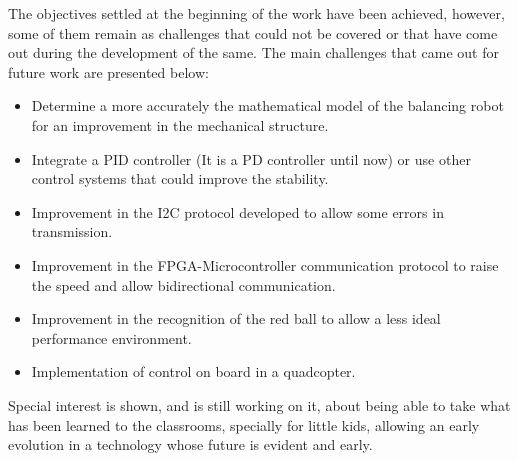 The objectives settled at the beginning of the work have been achieved, however, some of them remain as challenges that could not be covered or that have come out during the development of the same. The main challenges that came out for future work are presented below:
\begin{itemize}
	\item Determine a more accurately the mathematical model of the balancing robot for an improvement in the mechanical structure.
	\item Integrate a PID controller (It is a PD controller until now) or use other control systems that could improve the stability.
	\item Improvement in the I2C protocol developed to allow some errors in transmission.
	\item Improvement in the FPGA-Microcontroller communication protocol to raise the speed and allow bidirectional communication. 
	\item Improvement in the recognition of the red ball to allow a less ideal performance environment. 
	\item Implementation of control on board in a quadcopter.
\end{itemize}
Special interest is shown, and is still working on it, about being able to take what has been learned to the classrooms, specially for little kids, allowing an early evolution in a technology whose future is evident and early.
